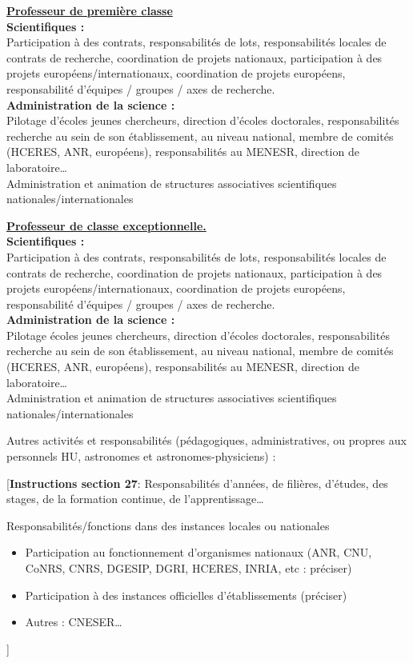 \documentclass[a4paper,10pt]{article}
\newcommand{\instructionsSection}[1]{{\color{blue}[\textbf{Instructions section 27}: #1]}}
\newcommand{\instructionsSection}[1]{}
\begin{document}
{\bigskip

\textbf{\underline{Professeur de première classe}}\\
\textbf{Scientifiques :}\\
Participation à des contrats, responsabilités de lots, responsabilités locales de contrats de recherche, coordination de projets nationaux, participation à des projets européens/internationaux, coordination de projets européens, responsabilité d'équipes / groupes / axes de recherche.\\
\textbf{Administration de la science :}\\
Pilotage d'écoles jeunes chercheurs, direction d'écoles doctorales, responsabilités recherche au sein de son établissement, au niveau national, membre de comités (HCERES, ANR, européens), responsabilités au MENESR, direction de laboratoire…\\
Administration et animation de structures associatives scientifiques nationales/internationales

\bigskip

\textbf{\underline{Professeur de classe exceptionnelle.}}\\
\textbf{Scientifiques :}\\
Participation à des contrats, responsabilités de lots, responsabilités locales de contrats de recherche, coordination de projets nationaux, participation à des projets européens/internationaux, coordination de projets européens, responsabilité d'équipes / groupes / axes de recherche.\\
\textbf{Administration de la science :}\\
Pilotage écoles jeunes chercheurs, direction d'écoles doctorales, responsabilités recherche au sein de son établissement, au niveau national, membre de comités (HCERES, ANR, européens), responsabilités au MENESR, direction de laboratoire…\\
Administration et animation de structures associatives scientifiques nationales/internationales

}


Autres activités et responsabilités (pédagogiques, administratives, ou propres aux personnels HU, astronomes et astronomes-physiciens) :

\instructionsSection{
Responsabilités d'années, de filières, d'études, des stages, de la formation continue, de l'apprentissage… 

Responsabilités/fonctions dans des instances locales ou nationales
\begin{itemize}
	\item Participation au fonctionnement d'organismes nationaux (ANR, CNU, CoNRS, CNRS, DGESIP, DGRI, HCERES, INRIA, etc : préciser)
	\item Participation à des instances officielles d'établissements (préciser)
	\item Autres : CNESER…
\end{itemize}

}
\end{document}
